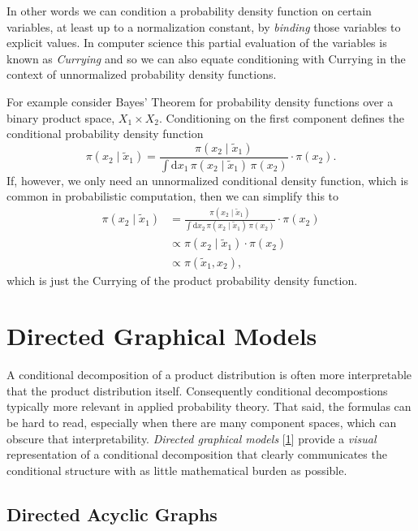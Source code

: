 \documentclass[]{article}
\begin{document}
In other words we can condition a probability density function on
certain variables, at least up to a normalization constant, by
\emph{binding} those variables to explicit values. In computer science
this partial evaluation of the variables is known as \emph{Currying} and
so we can also equate conditioning with Currying in the context of
unnormalized probability density functions.

For example consider Bayes' Theorem for probability density functions
over a binary product space, \(X_{1} \times X_{2}\). Conditioning on the
first component defines the conditional probability density function \[
\pi(x_{2} \mid \tilde{x}_{1})
=
\frac{ \pi(x_{2} \mid \tilde{x}_{1}) }
{ \int \mathrm{d} x_{1} \, \pi(x_{2} \mid \tilde{x}_{1}) \, \pi(x_{2}) }
\cdot \pi(x_{2}).
\] If, however, we only need an unnormalized conditional density
function, which is common in probabilistic computation, then we can
simplify this to \[
\begin{aligned}
\pi(x_{2} \mid \tilde{x}_{1})
&=
\frac{ \pi(x_{2} \mid \tilde{x}_{1}) }
{ \int \mathrm{d} x_{2} \, \pi(x_{2} \mid \tilde{x}_{1}) \, \pi(x_{2}) }
\cdot \pi(x_{2})
\\
&\propto
\pi(x_{2} \mid \tilde{x}_{1}) \cdot \pi(x_{2})
\\
&\propto
\pi(\tilde{x}_{1}, x_{2}),
\end{aligned}
\] which is just the Currying of the product probability density
function.

\hypertarget{directed-graphical-models}{%
\section{Directed Graphical Models}\label{directed-graphical-models}}

A conditional decomposition of a product distribution is often more
interpretable that the product distribution itself. Consequently
conditional decompostions typically more relevant in applied probability
theory. That said, the formulas can be hard to read, especially when
there are many component spaces, which can obscure that
interpretability. \emph{Directed graphical models}
{[}\protect\hyperlink{ref-Bishop:2006}{1}{]} provide a \emph{visual}
representation of a conditional decomposition that clearly communicates
the conditional structure with as little mathematical burden as
possible.

\hypertarget{directed-acyclic-graphs}{%
\subsection{Directed Acyclic Graphs}\label{directed-acyclic-graphs}}
\end{document}
